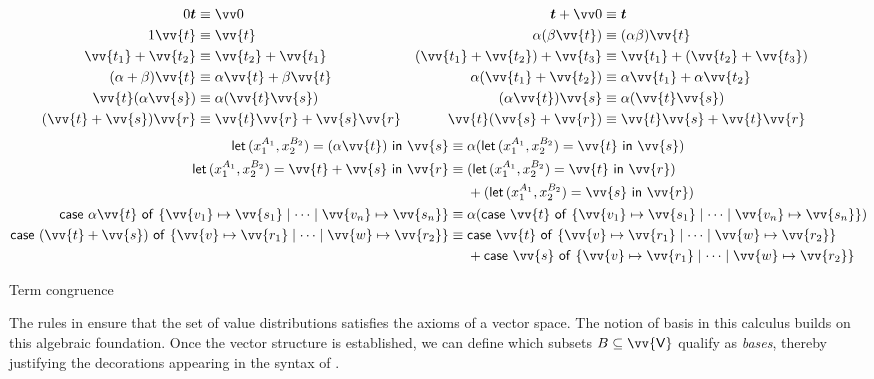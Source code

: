 \documentclass[runningheads,orivec,envcountsame,envcountsect]{llncs}
\DeclareRobustCommand{\ValD}{\ensuremath{\vv{\mathsf{V}}}}
\def\Pair#1#2{(#1,#2)} %
\def\letkeyword{\mathsf{let}}
\def\inkeyword{\mathsf{in}}
\def\LetP#1#2#3#4#5#6{\letkeyword\,\Pair{#1^{#2}}{#3^{#4}}=#5~\inkeyword~#6}
\def\gencase#1#2#3#4#5{\ensuremath{\mathsf{case}~#1~\mathsf{of}~\{#2\mapsto #4 \mid \dotsb \mid #3\mapsto #5\}}}
\begin{document}
\begin{table}[t]
  \begin{align*}
    0\vec t &\equiv \vv 0 & \vec t+\vv 0 &\equiv \vec t \\
    1\vv{t} &\equiv \vv{t} &
    \alpha(\beta\vv{t}) &\equiv (\alpha\beta)\vv{t} \\
    \vv{t_1}+\vv{t_2} &\equiv \vv{t_2}+\vv{t_1} &
    (\vv{t_1}+\vv{t_2})+\vv{t_3} &\equiv \vv{t_1}+(\vv{t_2}+\vv{t_3}) \\
    (\alpha+\beta)\vv{t} &\equiv \alpha\vv{t}+\beta\vv{t} &
    \alpha(\vv{t_1}+\vv{t_2}) &\equiv \alpha\vv{t_1}+\alpha\vv{t_2} \\
    \vv{t}(\alpha\vv{s}) &\equiv \alpha(\vv{t}\vv{s}) &
    (\alpha\vv{t})\vv{s} &\equiv \alpha(\vv{t}\vv{s}) \\
    (\vv{t}+\vv{s})\vv{r} &\equiv \vv{t}\vv{r}+\vv{s}\vv{r} &
    \vv{t}(\vv{s}+\vv{r}) &\equiv \vv{t}\vv{s}+\vv{t}\vv{r} &&
  \end{align*}
  \begin{align*}
    \LetP{x_1}{A_1}{x_2}{B_2}{(\alpha\vv{t})}{\vv{s}}
    &\equiv \alpha(\LetP{x_1}{A_1}{x_2}{B_2}{\vv{t}}{\vv{s}}) \\
    \LetP{x_1}{A_1}{x_2}{B_2}{\vv{t}+\vv{s}}{\vv{r}}
    &
    \equiv
    \begin{aligned}[t]
      &(\LetP{x_1}{A_1}{x_2}{B_2}{\vv{t}}{\vv{r}})\\
      &+(\LetP{x_1}{A_1}{x_2}{B_2}{\vv{s}}{\vv{r}}) 
    \end{aligned}\\
    \gencase{\alpha \vv{t}}{\vv{v_1}}{\vv{v_n}}{\vv{s_1}}{\vv{s_n}}
    &\equiv \alpha(\gencase{\vv{t}}{\vv{v_1}}{\vv{v_n}}{\vv{s_1}}{\vv{s_n}}) \\
    \gencase{(\vv{t}+\vv{s})}{\vv{v}}{\vv{w}}{\vv{r_1}}{\vv{r_2}}
    &\equiv\begin{aligned}[t]
      &\gencase{\vv{t}}{\vv{v}}{\vv{w}}{\vv{r_1}}{\vv{r_2}}\\
      &+\gencase{\vv{s}}{\vv{v}}{\vv{w}}{\vv{r_1}}{\vv{r_2}}
    \end{aligned}
  \end{align*}
  \caption{Term congruence}
  \label{tab:Congruence}
\end{table}

The rules in  ensure that the
set of value distributions satisfies the axioms of a vector space.  The notion
of basis in this calculus builds on this algebraic foundation. Once the vector
structure is established, we can define which subsets $B\subseteq \ValD$
qualify as \emph{bases}, thereby justifying the decorations appearing in the
syntax of .
\end{document}
